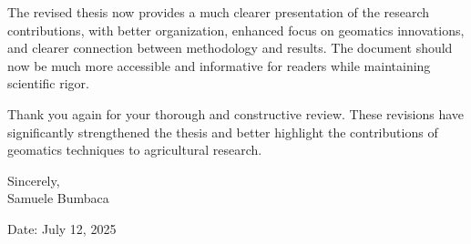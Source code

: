 \documentclass[11pt,a4paper]{article}
\begin{document}
The revised thesis now provides a much clearer presentation of the research contributions, with better organization, enhanced focus on geomatics innovations, and clearer connection between methodology and results. The document should now be much more accessible and informative for readers while maintaining scientific rigor.

Thank you again for your thorough and constructive review. These revisions have significantly strengthened the thesis and better highlight the contributions of geomatics techniques to agricultural research.

\vspace{1cm}

Sincerely,\\
Samuele Bumbaca

\vspace{0.5cm}

Date: July 12, 2025
\end{document}

